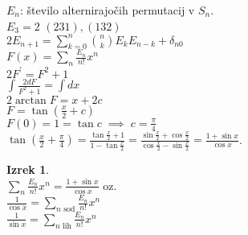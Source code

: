 \documentclass[a4paper, 12pt]{book}
\theoremstyle{definition}
\newtheorem{theorem}[counter]{Izrek}
\theoremstyle{remark}
\begin{document}
$E_n$: število alternirajočih permutacij v $S_n$. \\
$E_3 = 2$ $(231), (132)$ \\
$2 E_{n+1} = \sum_{k=0}^{n} \binom{n}{k} E_k E_{n-k} + \delta_{n0}$ \\
$F(x) = \sum_n \frac{E_n}{n!} x^n$ \\
$2 F^{'} = F^2 + 1$ \\
$\int \frac{2dF}{F^2 + 1} = \int dx$ \\
$2 \arctan F = x + 2c$ \\
$F = \tan \left(\frac{x}{2} + c \right)$ \\
$F(0) = 1 = \tan c \; \implies \; c = \frac{\pi}{4}$ \\
$\tan \left(\frac{x}{2} + \frac{\pi}{4}\right) = \frac{\tan \frac{x}{2} + 1}{1 - \tan \frac{x}{2}}
= \frac{\sin \frac{x}{2} + \cos \frac{x}{2}}{\cos \frac{x}{2} - \sin \frac{x}{2}} = \frac{1 + \sin x}{\cos x}$.
\begin{theorem} \text{} \\
  $\sum_n \frac{E_n}{n!} x^n = \frac{1 + \sin x}{\cos x}$ oz. \\
  $\frac{1}{\cos x} = \sum_{n \text{ sod}} \frac{E_n}{n!} x^n$ \\
  $\frac{1}{\sin x} = \sum_{n \text{ lih}} \frac{E_n}{n!} x^n$ \\
\end{theorem}
\end{document}

